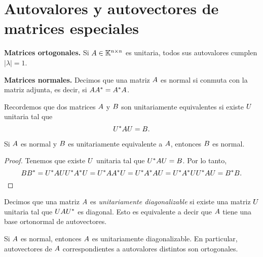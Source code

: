 \section{Autovalores y autovectores de matrices especiales}

\textbf{Matrices ortogonales.} Si $\Ab \in \K^{n \times n}$ es unitaria,
    todos sus autovalores cumplen $|\lambda| = 1$.

\textbf{Matrices normales.}
Decimos que una matriz $\Ab$ es normal si conmuta con la matriz adjunta, es decir, si $\Ab \Ab^* = \Ab^* \Ab$.

Recordemos que dos matrices $\Ab$ y $\Bb$ son unitariamente equivalentes si existe $\Ub$ unitaria tal que
$$
\Ub^* \Ab \Ub = \Bb.
$$

\begin{prop}
Si $\Ab$ es normal y $\Bb$ es unitariamente equivalente a $\Ab$, entonces $\Bb$ es normal.
\end{prop}
\begin{proof}
Tenemos que existe $\Ub$ unitaria tal que $\Ub^* \Ab \Ub = \Bb$. Por lo tanto,
$$
\Bb \Bb^* = \Ub^* \Ab \Ub \Ub^* \Ab^* \Ub = \Ub^* \Ab \Ab^* \Ub = \Ub^* \Ab^* \Ab \Ub = \Ub^* \Ab^* \Ub \Ub^* \Ab \Ub = \Bb^* \Bb.
$$
\end{proof}

Decimos que una matriz $\Ab$ es \emph{unitariamente diagonalizable} si existe una matriz $\Ub$ unitaria tal que $\Ub \Ab \Ub^*$ es diagonal. Esto es equivalente a decir que $\Ab$ tiene una base ortonormal de autovectores.

\begin{prop}
Si $\Ab$ es normal, entonces $\Ab$ es unitariamente diagonalizable. En particular, autovectores de $\Ab$ correspondientes a autovalores distintos son ortogonales.
\end{prop}

